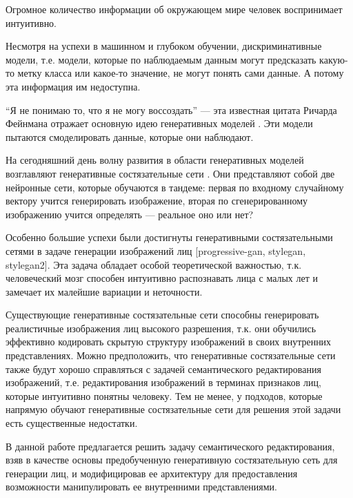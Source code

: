 Огромное количество информации об окружающем мире человек воспринимает интуитивно.

Несмотря на успехи в машинном и глубоком обучении, дискриминативные модели, т.е. модели, которые по наблюдаемым данным могут предсказать какую-то метку класса или какое-то значение, не могут понять сами данные. А потому эта информация им недоступна.

“Я не понимаю то, что я не могу воссоздать” — эта известная цитата Ричарда Фейнмана отражает основную идею генеративных моделей \cite{jebara2012machine}. Эти модели пытаются смоделировать данные, которые они наблюдают.

На сегодняшний день волну развития в области генеративных моделей возглавляют генеративные состязательные сети \cite{goodfellow2014generative}. Они представляют собой две нейронные сети, которые обучаются в тандеме: первая по входному случайному вектору учится генерировать изображение, вторая по сгенерированному изображению учится определять — реальное оно или нет?

Особенно большие успехи были достигнуты генеративными состязательными сетями в задаче генерации изображений лиц [progressive-gan, stylegan, stylegan2]. Эта задача обладает особой теоретической важностью, т.к. человеческий мозг способен интуитивно распознавать лица с малых лет и замечает их малейшие вариации и неточности.

Существующие генеративные состязательные сети способны генерировать реалистичные изображения лиц высокого разрешения, т.к. они обучились эффективно кодировать скрытую структуру изображений в своих внутренних представлениях.
Можно предположить, что генеративные состязательные сети также будут хорошо справляться с задачей семантического редактирования изображений, т.е. редактирования изображений в терминах признаков лиц, которые интуитивно понятны человеку.
Тем не менее, у подходов, которые напрямую обучают генеративные состязательные сети для решения этой задачи есть существенные недостатки.

В данной работе предлагается решить задачу семантического редактирования, взяв в качестве основы предобученную генеративную состязательную сеть для генерации лиц, и модифицировав ее архитектуру для предоставления возможности манипулировать ее внутренними представлениями.